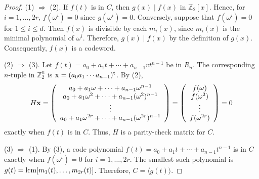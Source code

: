 \begin{proof}
(1) $\Rightarrow$ (2).
If $f(t)$ is in $C$, then $g(x) \mid f(x)$ in ${\mathbb Z}_2[x]$. Hence,
for $i = 1, \ldots, 2r$, $f( \omega^i) = 0$ since $g( \omega^i ) =
0$. Conversely, suppose that $f( \omega^i) = 0$ for $1 \leq i \leq d$.
Then $f(x)$ is divisible by each $m_i(x)$, since $m_i(x)$ is the
minimal polynomial of $\omega^i$. Therefore, $g(x) \mid f(x)$ by the
definition of $g(x)$. Consequently, $f(x)$ is a codeword.


(2) $\Rightarrow$ (3).
Let \mbox{$f(t) = a_0 + a_1 t + \cdots + a_{n-1}v t^{n-1}$} be in $R_n$. The
corresponding $n$-tuple in ${\mathbb Z}_2^n$ is ${\bold x} = (a_0 a_1
\cdots a_{n-1})^{\rm t}$. By (2),
$$
H {\bold x}
=
\left(
\begin{array}{c}
a_0 + a_1 \omega + \cdots + a_{n-1} \omega^{n-1} \\
a_0 + a_1 \omega^2 + \cdots + a_{n-1} (\omega^2)^{n-1} \\
\vdots \\
a_0 + a_1 \omega^{2r} + \cdots + a_{n-1} (\omega^{2r})^{n-1}
\end{array}
\right)
=
\left(
\begin{array}{c}
f(\omega) \\
f(\omega^2) \\
\vdots \\
f(\omega^{2r})
\end{array}
\right)
=0
$$
exactly when $f(t)$ is in $C$. Thus, $H$ is a parity-check matrix for
$C$.

(3) $\Rightarrow$ (1).
By (3), a code polynomial $f(t) = a_0 + a_1 t + \cdots + a_{n-1}
t^{n-1}$ is in $C$ exactly when $f(\omega^i) = 0$ for $i = 1, \ldots,
2r$. The smallest such polynomial is $g(t) = \operatorname{lcm}[ m_1(t),\ldots,
m_{2r}(t)]$.  Therefore, $C = \langle g(t) \rangle$.
\end{proof}


\medskip


